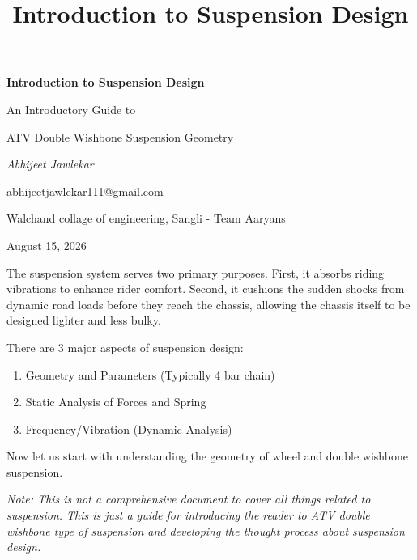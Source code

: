 \documentclass[12pt,a4paper]{article}
\title{\textbf{Introduction to Suspension Design}}
\author{}
\date{}
\begin{document}
\begin{titlepage}
    \centering
    \vspace*{2.5cm}

    {\Huge\bfseries Introduction to Suspension Design\par}
    \vspace{0.5cm}
    {\large An Introductory Guide to 
    
    ATV Double Wishbone Suspension Geometry\par}

    \vspace{3cm}

    {\large\itshape Abhijeet Jawlekar\par}
    {\normalsize abhijeetjawlekar111@gmail.com\par}
    {\normalsize Walchand collage of engineering, Sangli - Team Aaryans \par}

    \vfill

    {\normalsize August 15, 2026 \par}

\end{titlepage}

\maketitle

\vspace{-20mm}
The suspension system serves two primary purposes. First, it absorbs riding vibrations to enhance rider comfort. Second, it cushions the sudden shocks from dynamic road loads before they reach the chassis, allowing the chassis itself to be designed lighter and less bulky.

There are 3 major aspects of suspension design:
\begin{enumerate}
    \item Geometry and Parameters (Typically 4 bar chain)
    \item Static Analysis of Forces and Spring
    \item Frequency/Vibration (Dynamic Analysis)
\end{enumerate}

Now let us start with understanding the geometry of wheel and double wishbone suspension.

\textit{Note: This is not a comprehensive document to cover all things related to suspension.
This is just a guide for introducing the reader to ATV double wishbone type of suspension
and developing the thought process about suspension design.}
\end{document}
